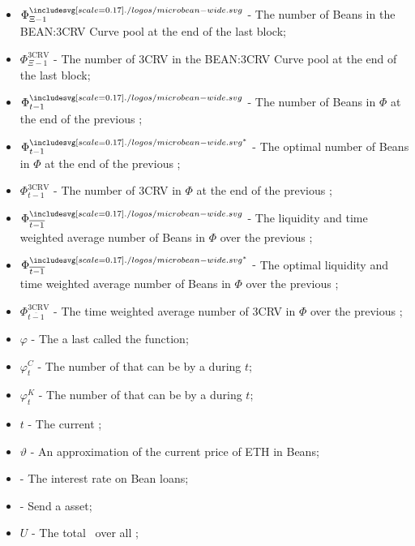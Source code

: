\documentclass[class=article, crop=false]{standalone}
\begin{document}
\begin{itemize}[topsep=0pt, itemsep=3pt,leftmargin=16pt]
    \item[] $\Phi_{\Xi-1}^{\bean}$ - \hypertarget{ht193}{The number of Beans in the BEAN:3CRV Curve pool at the end of the last block};
    \item[] $\Phi_{\Xi-1}^{\text{3CRV}}$ - \hypertarget{ht194}{The number of 3CRV in the BEAN:3CRV Curve pool at the end of the last block};
    \item[] $\Phi_{t-1}^{\bean}$ - \hypertarget{ht195}{The number of Beans in $\Phi$ at the end of the previous };
    \item[] $\Phi_{t-1}^{{\bean}^*}$ - \hypertarget{ht196}{The optimal number of Beans in $\Phi$ at the end of the previous };
    \item[] $\Phi_{t-1}^{\text{3CRV}}$ - \hypertarget{ht197}{The number of 3CRV in $\Phi$ at the end of the previous };
    \item[] $\Phi_{\overline{t-1}}^{\bean}$ - \hypertarget{ht198}{The liquidity and time weighted average number of Beans in $\Phi$ over the previous };
    \item[] $\Phi_{\overline{t-1}}^{{\bean}^*}$ - \hypertarget{ht199}{The optimal liquidity and time weighted average number of Beans in $\Phi$ over the previous };
    \item[] $\Phi_{\overline{t-1}}^{\text{3CRV}}$ - \hypertarget{ht200}{The time weighted average number of 3CRV in $\Phi$ over the previous };
    \item[] $\varphi$ - \hypertarget{ht201}{The  a  last called the  function};
    \item[] ${\varphi}_t^C$ - \hypertarget{ht202}{The number of  that can be  by a  during $t$};
    \item[] ${\varphi}_t^K$ - \hypertarget{ht203}{The number of  that can be  by a  during $t$};
    \item[] $t$ - \hypertarget{ht204}{The current };
    \item[] $\vartheta$ - An approximation of the current price of ETH in Beans;
    \item[]  - \hypertarget{ht205}{The interest rate on Bean loans};
    \item[]  - \hypertarget{ht206}{Send a  asset};
    \item[] $U$ - \hypertarget{ht207}{The total  \Bean\ over all };

\end{itemize}
\end{document}
